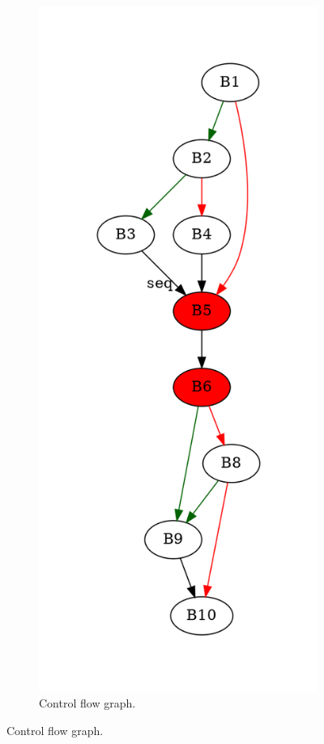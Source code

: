 \documentclass[aspectratio=1610]{beamer}
\begin{document}
\begin{frame}[noframenumbering]
\begin{figure}[htbp]
\begin{subfigure}[b]{0.50\textwidth}
			\includegraphics[height=0.7\paperheight]{inc/methods/hammock/counter-example/jump-threading-and-short-circuit/jump-threading-and-short-circuit_jump/f_0004a.png}
			\caption{Control flow graph.}
		\end{subfigure}
	\end{figure}
\end{frame}
\end{document}
